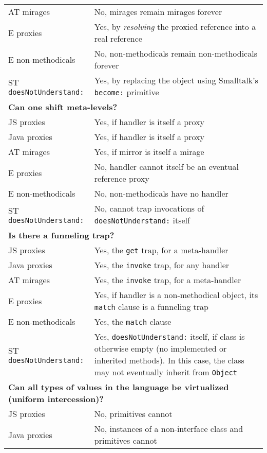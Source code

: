 \documentclass{acm_proc_article-sp}
\begin{document}
\begin{table*}
\begin{tabular}{|p{}|p{}|}
    AT mirages        & No, mirages remain mirages forever\\
    E proxies         & Yes, by \emph{resolving} the proxied reference into a real reference\\
    E non-methodicals & No, non-methodicals remain non-methodicals forever\\
    ST \texttt{doesNotUnderstand:}  & Yes, by replacing the object using Smalltalk's \texttt{become:} primitive\\
    \hline
    \multicolumn{2}{|l|}{\textbf{Can one shift meta-levels?}}\\
    \hline
    JS proxies        & Yes, if handler is itself a proxy\\
    Java proxies      & Yes, if handler is itself a proxy\\
    AT mirages        & Yes, if mirror is itself a mirage\\
    E proxies         & No, handler cannot itself be an eventual reference proxy\\
    E non-methodicals & No, non-methodicals have no handler\\
    ST \texttt{doesNotUnderstand:}  & No, cannot trap invocations of \texttt{doesNotUnderstand:} itself\\
    \hline
    \multicolumn{2}{|l|}{\textbf{Is there a funneling trap?}}\\
    \hline
    JS proxies        & Yes, the \texttt{get} trap, for a meta-handler\\
    Java proxies      & Yes, the \texttt{invoke} trap, for any handler\\
    AT mirages        & Yes, the \texttt{invoke} trap, for a meta-handler\\
    E proxies         & Yes, if handler is a non-methodical object, its \texttt{match} clause is a funneling trap\\
    E non-methodicals & Yes, the \texttt{match} clause\\
    ST \texttt{doesNotUnderstand:}  & Yes, \texttt{doesNotUnderstand:} itself, if class is otherwise empty (no implemented or inherited methods). In this case, the class may not eventually inherit from \texttt{Object}\\
    \hline
    \multicolumn{2}{|l|}{\textbf{Can all types of values in the language be virtualized (uniform intercession)?}}\\
    \hline
    JS proxies        & No, primitives cannot\\
    Java proxies      & No, instances of a non-interface class and primitives cannot\\

\end{tabular}
\end{table*}
\end{document}
